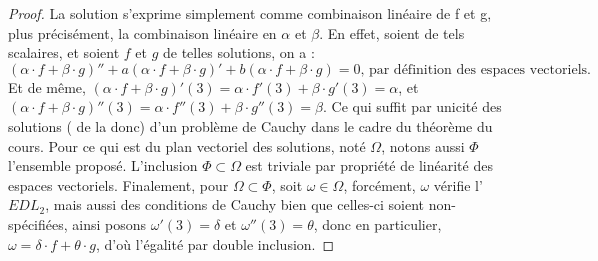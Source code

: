 \documentclass{article}
\begin{document}
\begin{proof}
    La solution s'exprime simplement comme combinaison linéaire de f et g, plus précisément, la 
    combinaison linéaire en $\alpha$ et $\beta$. En effet, soient de tels scalaires, et soient $f$ et 
    $g$ de telles solutions, on a : 
    \[
        (\alpha \cdot f + \beta \cdot g)'' + a (\alpha \cdot f + \beta \cdot g)' + b (\alpha \cdot f + 
        \beta \cdot g) = 0 \text{, par définition des espaces vectoriels.}
    \]
    Et de même, $(\alpha \cdot f + \beta \cdot g)'(3) = \alpha \cdot f'(3) + \beta \cdot g'(3) = \alpha$,
    et $(\alpha \cdot f + \beta \cdot g)''(3) = \alpha \cdot f''(3) + \beta \cdot g''(3) = \beta$.
    \newline
    Ce qui suffit par unicité des solutions ( de la donc) d'un problème de Cauchy dans le cadre du 
    théorème du cours.
    \newline
    Pour ce qui est du plan vectoriel des solutions, noté $\Omega$, notons aussi $\Phi$ l'ensemble proposé.
    L'inclusion $\Phi \subset \Omega$ est triviale par propriété de linéarité des espaces vectoriels.
    Finalement, pour $\Omega \subset \Phi$, soit $\omega \in \Omega$, forcément, $\omega$ vérifie 
    l'$EDL_2$, mais aussi des conditions de Cauchy bien que celles-ci soient non-spécifiées, ainsi
    posons $\omega'(3) = \delta$ et $\omega''(3) = \theta$, donc en particulier, $ \omega = 
    \delta \cdot f + \theta \cdot g$, d'où l'égalité par double inclusion.
\end{proof}
\end{document}
